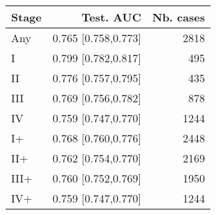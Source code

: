 \begin{table}[ht]
\centering
\begin{tabular}{lrr}
  \toprule
Stage & Test. AUC & Nb. cases \\ 
  \midrule
Any & 0.765 [0.758,0.773] & 2818 \\ 
   \addlinespace
I & 0.799 [0.782,0.817] & 495 \\ 
  II & 0.776 [0.757,0.795] & 435 \\ 
  III & 0.769 [0.756,0.782] & 878 \\ 
  IV & 0.759 [0.747,0.770] & 1244 \\ 
   \addlinespace
I+ & 0.768 [0.760,0.776] & 2448 \\ 
  II+ & 0.762 [0.754,0.770] & 2169 \\ 
  III+ & 0.760 [0.752,0.769] & 1950 \\ 
  IV+ & 0.759 [0.747,0.770] & 1244 \\ 
   \bottomrule
\end{tabular}
\end{table}
